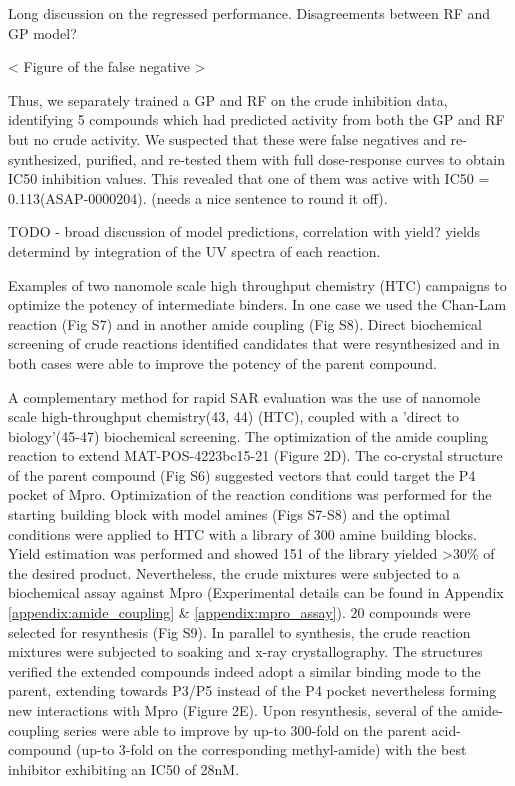 Long discussion on the regressed performance. Disagreements between RF and GP model?

< Figure of the false negative >

Thus, we separately trained a GP and RF on the crude inhibition data, identifying 5 compounds which had predicted activity from both the GP and RF but no crude activity. We suspected that these were false negatives and re-synthesized, purified, and re-tested them with full dose-response curves to obtain IC50 inhibition values. This revealed that one of them was active with IC50 = 0.113\uM (ASAP-0000204). (needs a nice sentence to round it off).

TODO - broad discussion of model predictions, correlation with yield?
yields determind by integration of the UV spectra of each reaction.

Examples of two nanomole scale high throughput chemistry (HTC) campaigns to optimize the potency of intermediate binders. In one case we used the Chan-Lam reaction (Fig S7) and in another amide coupling (Fig S8). Direct biochemical screening of crude reactions identified candidates that were resynthesized and in both cases were able to improve the potency of the parent compound.

A complementary method for rapid SAR evaluation was the use of nanomole scale high-throughput chemistry(43, 44) (HTC), coupled with a 'direct to biology'(45-47) biochemical screening. The optimization of the amide coupling reaction to extend MAT-POS-4223bc15-21 (Figure 2D). The co-crystal structure of the parent compound (Fig S6) suggested vectors that could target the P4 pocket of Mpro. Optimization of the reaction conditions was performed for the starting building block with model amines (Figs S7-S8) and the optimal conditions were applied to HTC with a library of 300 amine building blocks. Yield estimation was performed and showed 151 of the library yielded >30\% of the desired product. Nevertheless, the crude mixtures were subjected to a biochemical assay against Mpro (Experimental details can be found in Appendix \ref{appendix:amide_coupling} \& \ref{appendix:mpro_assay}). 20 compounds were selected for resynthesis (Fig S9). In parallel to synthesis, the crude reaction mixtures were subjected to soaking and x-ray crystallography. The structures verified the extended compounds indeed adopt a similar binding mode to the parent, extending towards P3/P5 instead of the P4 pocket nevertheless forming new interactions with Mpro (Figure 2E). Upon resynthesis, several of the amide-coupling series were able to improve by up-to 300-fold on the parent acid-compound (up-to 3-fold on the corresponding methyl-amide) with the best inhibitor exhibiting an IC50 of 28nM.




